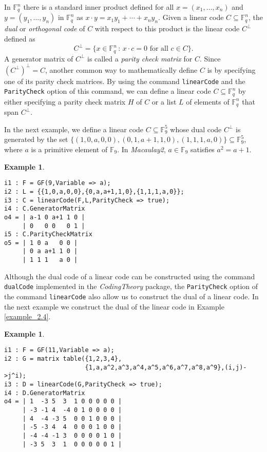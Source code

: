 \documentclass[12pt]{amsart}
\theoremstyle{plain}
\newtheorem{example}[theorem]{Example}
\begin{document}
In $\mathbb{F}_q^n$ there is a standard inner product defined for all $x=(x_1,\ldots,x_n)$ and $y=(y_1,\ldots,y_n)$ in $\mathbb{F}_q^n$ as $x\cdot y=x_1y_1+\cdots+x_ny_n.$ Given a linear code $C\subseteq \mathbb{F}^n_q$, the {\it dual} or {\it orthogonal code} of $C$ with respect to this product is the linear code $C^{\perp}$ defined as
\[
C^\perp=\{x\in \mathbb{F}_q^n\,:\,x\cdot c=0 \text{ for all }c\in C\}.
\]
A generator matrix of $C^{\perp}$ is called a {\it parity check matrix} for $C$. Since $(C^{\perp})^{\perp}=C$, another common way to mathematically define $C$ is by specifying one of its parity check matrices. By using the command {\tt linearCode} and the {\tt ParityCheck} option of this command, we can define a linear code $C\subseteq \mathbb{F}^n_q$ by either specifying a parity check matrix $H$ of $C$ or a list $L$ of elements of $\mathbb{F}_q^n$ that span $C^{\perp}$.

In the next example, we define a linear code $C\subseteq \mathbb{F}_9^5$ whose dual code $C^{\perp}$ is generated by the set $\{(1,0,a,0,0),(0,1,a+1,1,0),(1,1,1,a,0)\}\subseteq \mathbb{F}^5_9$, where $a$ is a primitive element of $\mathbb{F}_9$. In {\it Macaulay2}, $a\in\mathbb{F}_9$ satisfies $a^2=a+1$.

\begin{example}\label{example_2.5}
$\,$
\begin{verbatim}
i1 : F = GF(9,Variable => a);
i2 : L = {{1,0,a,0,0},{0,a,a+1,1,0},{1,1,1,a,0}};
i3 : C = linearCode(F,L,ParityCheck => true);
i4 : C.GeneratorMatrix
o4 = | a-1 0 a+1 1 0 |
     | 0   0 0   0 1 |
i5 : C.ParityCheckMatrix
o5 = | 1 0 a   0 0 |
     | 0 a a+1 1 0 |
     | 1 1 1   a 0 |
\end{verbatim}
\end{example}


Although the dual code of a linear code can be constructed using the command {\tt dualCode} implemented in the {\it CodingTheory} package, the {\tt ParityCheck} option of the command {\tt linearCode} also allow us to construct the dual of a linear code. In the next example we construct the dual of the linear code in Example \ref{example_2.4}.

\begin{example}\label{example_2.5}
 $\,$
 \begin{verbatim}
i1 : F = GF(11,Variable => a);
i2 : G = matrix table({1,2,3,4},
                      {1,a,a^2,a^3,a^4,a^5,a^6,a^7,a^8,a^9},(i,j)->j^i);
i3 : D = linearCode(G,ParityCheck => true);
i4 : D.GeneratorMatrix
o4 = | 1  -3 5  3  1 0 0 0 0 0 |
     | -3 -1 4  -4 0 1 0 0 0 0 |
     | 4  -4 -3 5  0 0 1 0 0 0 |
     | -5 -3 4  4  0 0 0 1 0 0 |
     | -4 -4 -1 3  0 0 0 0 1 0 |
     | -3 5  3  1  0 0 0 0 0 1 |
 \end{verbatim}
\end{example}
\end{document}
